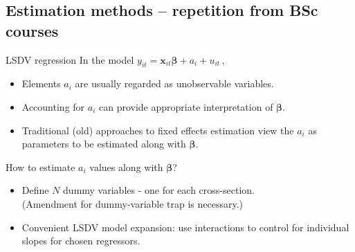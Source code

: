 \documentclass[usenames,dvipsnames]{beamer}
\begin{document}
\subsection*{Estimation methods -- repetition from BSc courses}
\begin{frame}{LSDV regression}
\small 
In the model \quad  $y_{it} = \bm{x}_{it} \bm{\beta} + a_i + u_{it} \,$, \\
\bigskip
\begin{itemize}
    \item Elements $a_i$ are usually regarded as unobservable variables.
    \smallskip
    \item Accounting for $a_i$ can provide appropriate interpretation of $\bm{\beta}$.
    \smallskip
    \item Traditional (old) approaches to fixed effects estimation view the $a_i$ as parameters to be estimated along with $\bm{\beta}$. \\
\end{itemize}

\bigskip
How to estimate $a_i$ values along with $\bm{\beta}$?\\
\medskip
\begin{itemize}
\item Define $N$ dummy variables - one for each cross-section. \\
(Amendment for dummy-variable trap is necessary.)
\smallskip
\item Convenient LSDV model expansion: use interactions to control for individual slopes for chosen regressors.
\end{itemize}
\end{frame}
\end{document}
